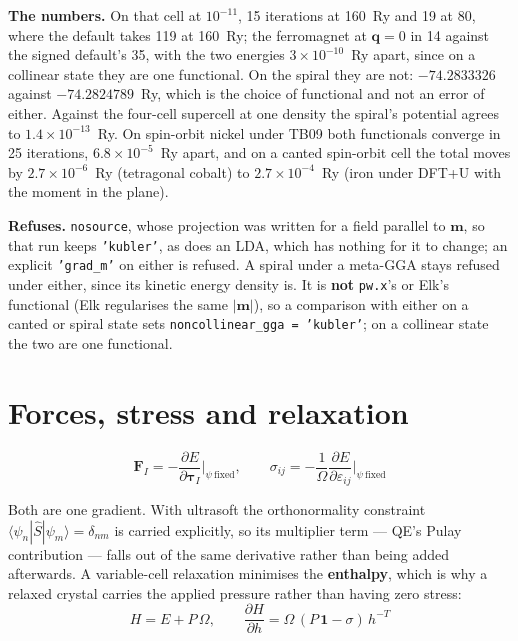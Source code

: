 \documentclass[11pt,a4paper]{article}
\newcommand{\code}[1]{\texttt{\small #1}}
\begin{document}
\textbf{The numbers.} On that cell at $10^{-11}$, 15 iterations at 160~Ry and 19
at 80, where the default takes 119 at 160~Ry; the ferromagnet at
$\mathbf q = 0$ in 14 against the signed default's 35, with the two energies
$3\times10^{-10}$~Ry apart, since on a collinear state they are one functional.
On the spiral they are not: $-74.2833326$ against $-74.2824789$~Ry, which is the
choice of functional and not an error of either. Against the four-cell supercell
at one density the spiral's potential agrees to $1.4\times10^{-13}$~Ry. On spin-orbit
nickel under TB09 both functionals converge in 25 iterations, $6.8\times10^{-5}$~Ry apart,
and on a canted spin-orbit cell the total moves by $2.7\times10^{-6}$~Ry (tetragonal
cobalt) to $2.7\times10^{-4}$~Ry (iron under DFT+U with the moment in the plane).

\begin{refuses}
\textbf{Refuses.} \code{nosource}, whose projection was written for a field parallel
to $\mathbf m$, so that run keeps \code{'kubler'}, as does an LDA, which has nothing for
it to change; an explicit \code{'grad\_m'} on either is refused. A spiral under a
meta-GGA stays refused under either, since its kinetic energy density is. It
is \textbf{not} \code{pw.x}'s or Elk's functional (Elk regularises the same
$|\mathbf m|$), so a comparison with either on a canted or spiral state sets
\code{noncollinear\_gga = 'kubler'}; on a collinear state the two are one functional.
\end{refuses}

\section{Forces, stress and relaxation}

\begin{equation*}
\mathbf F_I = -\frac{\partial E}{\partial\boldsymbol\tau_I}\bigg|_{\psi\ \mathrm{fixed}},
\qquad
\sigma_{ij} = -\frac{1}{\Omega}\frac{\partial E}{\partial\varepsilon_{ij}}\bigg|_{\psi\ \mathrm{fixed}}
\end{equation*}

Both are one gradient. With ultrasoft the orthonormality constraint
$\langle\psi_n|\hat S|\psi_m\rangle=\delta_{nm}$ is carried explicitly, so its
multiplier term --- QE's Pulay contribution --- falls out of the same derivative
rather than being added afterwards. A variable-cell relaxation minimises the
\textbf{enthalpy}, which is why a relaxed crystal carries the applied pressure
rather than having zero stress:
\begin{equation*}
H = E + P\,\Omega,
\qquad \frac{\partial H}{\partial h} = \Omega\,(P\,\mathbf 1 - \sigma)\,h^{-T}
\end{equation*}
\end{document}
